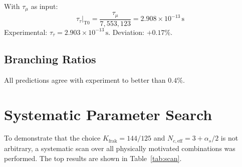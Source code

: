 	With $\tau_\mu$ as input:
	\begin{equation}
		\tau_\tau\big|_\text{T0} = \frac{\tau_\mu}{7{,}553{,}123} = 2.908 \times 10^{-13} \, \text{s}
	\end{equation}
	Experimental: $\tau_\tau = 2.903 \times 10^{-13} \, \text{s}$. Deviation: $+0.17\%$.
	
	\subsection{Branching Ratios}
	
	\begin{table}[h]
		\centering
		\caption{Comparison of T0 prediction with experimental values. $\alpha_s$ from T0 geometry.}
		\label{tab:results}
	\end{table}
	
	All predictions agree with experiment to better than $0.4\%$.
	
	
	\section{Systematic Parameter Search}
	
	To demonstrate that the choice $K_\text{frak} = 144/125$ and $N_{c,\text{eff}} = 3 + \alpha_s/2$ is not arbitrary, a systematic scan over all physically motivated combinations was performed. The top results are shown in Table~\ref{tab:scan}.
	
